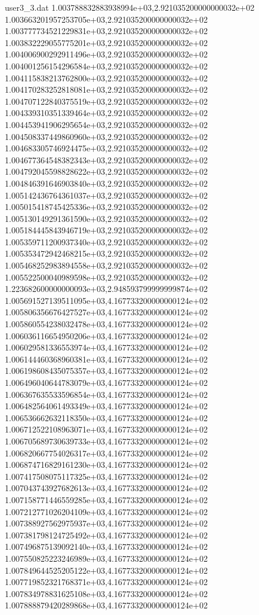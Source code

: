\begin{filecontents}{user3_3.dat}
1.003788832883938994e+03,2.921035200000000032e+02
1.003663201957253705e+03,2.921035200000000032e+02
1.003777734521229831e+03,2.921035200000000032e+02
1.003832229055775201e+03,2.921035200000000032e+02
1.004006900292911496e+03,2.921035200000000032e+02
1.004001256154296584e+03,2.921035200000000032e+02
1.004115838213762800e+03,2.921035200000000032e+02
1.004170283252818081e+03,2.921035200000000032e+02
1.004707122840375519e+03,2.921035200000000032e+02
1.004339310351339464e+03,2.921035200000000032e+02
1.004453941906295654e+03,2.921035200000000032e+02
1.004508337449860960e+03,2.921035200000000032e+02
1.004683305746924475e+03,2.921035200000000032e+02
1.004677364548382343e+03,2.921035200000000032e+02
1.004792045598828622e+03,2.921035200000000032e+02
1.004846391646903840e+03,2.921035200000000032e+02
1.005142436764361037e+03,2.921035200000000032e+02
1.005015418745425336e+03,2.921035200000000032e+02
1.005130149291361590e+03,2.921035200000000032e+02
1.005184445843946719e+03,2.921035200000000032e+02
1.005359711200937340e+03,2.921035200000000032e+02
1.005353472942468215e+03,2.921035200000000032e+02
1.005468252983894558e+03,2.921035200000000032e+02
1.005522500040989598e+03,2.921035200000000032e+02
1.223682600000000093e+03,2.948593799999999874e+02
1.005691527139511095e+03,4.167733200000000124e+02
1.005806356676427527e+03,4.167733200000000124e+02
1.005860554238032478e+03,4.167733200000000124e+02
1.006036116654950206e+03,4.167733200000000124e+02
1.006029581336553974e+03,4.167733200000000124e+02
1.006144460368960381e+03,4.167733200000000124e+02
1.006198608435075357e+03,4.167733200000000124e+02
1.006496040644783079e+03,4.167733200000000124e+02
1.006367635533596854e+03,4.167733200000000124e+02
1.006482564061493349e+03,4.167733200000000124e+02
1.006536662632118350e+03,4.167733200000000124e+02
1.006712522108963071e+03,4.167733200000000124e+02
1.006705689730639733e+03,4.167733200000000124e+02
1.006820667754026317e+03,4.167733200000000124e+02
1.006874716829161230e+03,4.167733200000000124e+02
1.007417508075117325e+03,4.167733200000000124e+02
1.007043743927682613e+03,4.167733200000000124e+02
1.007158771446559285e+03,4.167733200000000124e+02
1.007212771026204109e+03,4.167733200000000124e+02
1.007388927562975937e+03,4.167733200000000124e+02
1.007381798124725492e+03,4.167733200000000124e+02
1.007496875139092140e+03,4.167733200000000124e+02
1.007550825223246989e+03,4.167733200000000124e+02
1.007849644525205122e+03,4.167733200000000124e+02
1.007719852321768371e+03,4.167733200000000124e+02
1.007834978831625108e+03,4.167733200000000124e+02
1.007888879420289868e+03,4.167733200000000124e+02

\end{filecontents}

